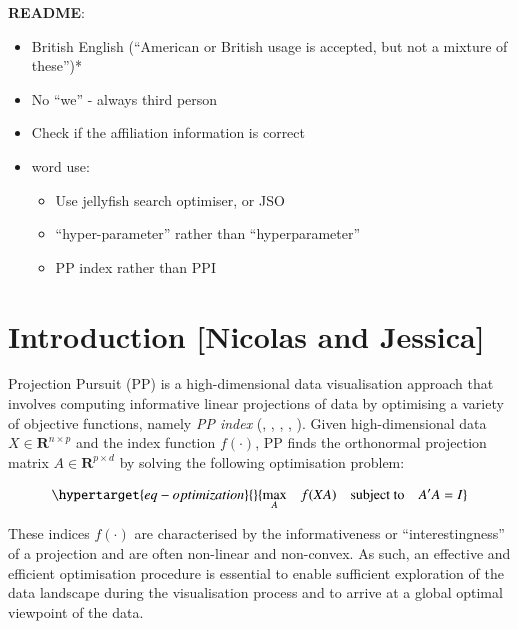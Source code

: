 \documentclass[
  number,
  preprint,
  3p]{elsarticle}
\providecommand{\tightlist}{%
  \setlength{\itemsep}{0pt}\setlength{\parskip}{0pt}}\usepackage{longtable,booktabs,array}
\begin{document}
\textbf{README}:

\begin{itemize}
\item
  British English (``American or British usage is accepted, but not a
  mixture of these'')*
\item
  No ``we'' - always third person
\item
  Check if the affiliation information is correct
\item
  word use:

  \begin{itemize}
  \tightlist
  \item
    Use jellyfish search optimiser, or JSO
  \item
    ``hyper-parameter'' rather than ``hyperparameter''
  \item
    PP index rather than PPI
  \end{itemize}
\end{itemize}

\hypertarget{introduction-nicolas-and-jessica}{%
\section{Introduction {[}Nicolas and
Jessica{]}}\label{introduction-nicolas-and-jessica}}

Projection Pursuit (PP) is a high-dimensional data visualisation
approach that involves computing informative linear projections of data
by optimising a variety of objective functions, namely \emph{PP index}
(\citet{hall1989polynomial}, \citet{cook1993projection},
\citet{lee2010projection}, \citet{Loperfido2018},
\citet{Loperfido2020}). Given high-dimensional data
\(X \in \mathbf{R}^{n\times p}\) and the index function \(f(\cdot)\), PP
finds the orthonormal projection matrix
\(A \in \mathbf{R}^{p \times d}\) by solving the following optimisation
problem:

\begin{equation}\protect\hypertarget{eq-optimization}{}{
\underset{A}{\max } \quad f(XA) \quad \text{subject to} \quad A'A = I
}\label{eq-optimization}\end{equation}

These indices \(f(\cdot)\) are characterised by the informativeness or
``interestingness'' of a projection and are often non-linear and
non-convex. As such, an effective and efficient optimisation procedure
is essential to enable sufficient exploration of the data landscape
during the visualisation process and to arrive at a global optimal
viewpoint of the data.
\end{document}
